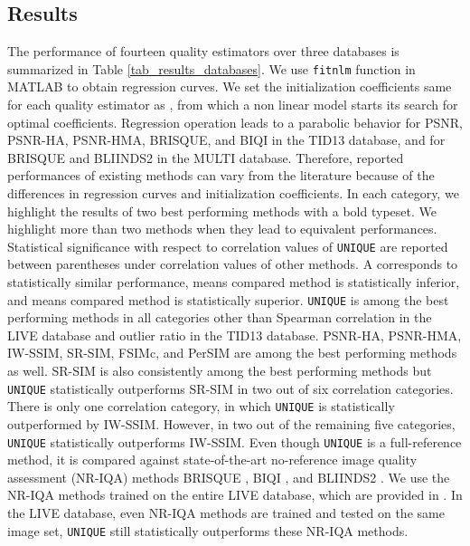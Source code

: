 \documentclass[draftcls,12pt, onecolumn]{IEEEtran}
\begin{document}
\vspace{-12.0mm}


\subsection{Results}
\label{subsec:val_results}
The performance of fourteen quality estimators over three databases is summarized in Table \ref{tab_results_databases}. We use \texttt{fitnlm} function in MATLAB \textsuperscript{\textregistered} to obtain regression curves. We set the initialization coefficients same for each quality estimator  as , from  which a non linear model starts its search for optimal coefficients. Regression operation leads to a parabolic behavior for PSNR, PSNR-HA, PSNR-HMA, BRISQUE, and BIQI in the TID13 database, and for BRISQUE and BLIINDS2 in the MULTI database. Therefore, reported performances of existing methods can vary from the literature because of the differences in regression curves and initialization coefficients. In each category, we highlight the results of two best performing methods with a bold typeset. We highlight more than two methods when they lead to equivalent performances. Statistical significance with respect to correlation values of \texttt{UNIQUE} are reported between parentheses under correlation values of other methods. A  corresponds to statistically similar performance,  means compared method is statistically inferior, and  means compared method is statistically superior. \texttt{UNIQUE} is among the best performing methods in all categories other than Spearman correlation in the LIVE database and outlier ratio in the TID13 database. PSNR-HA, PSNR-HMA, IW-SSIM, SR-SIM, FSIMc, and PerSIM are among the best performing methods as well. SR-SIM is also consistently among the best performing methods but \texttt{UNIQUE} statistically outperforms SR-SIM in two out of six correlation categories. There is only one correlation category, in which \texttt{UNIQUE} is statistically outperformed by IW-SSIM. However, in two out of the remaining five categories, \texttt{UNIQUE} statistically outperforms IW-SSIM. Even though \texttt{UNIQUE} is a full-reference method, it is compared against state-of-the-art no-reference image quality assessment (NR-IQA) methods  BRISQUE \cite{Mittal2012}, BIQI \cite{Moorthy2010}, and BLIINDS2 \cite{Saad2012}. We use the NR-IQA methods trained on the entire LIVE database, which are provided in \cite{LIVEWeb}. In the LIVE database, even NR-IQA methods are trained and tested on the same image set, \texttt{UNIQUE}  still statistically outperforms these NR-IQA methods. 
\end{document}
